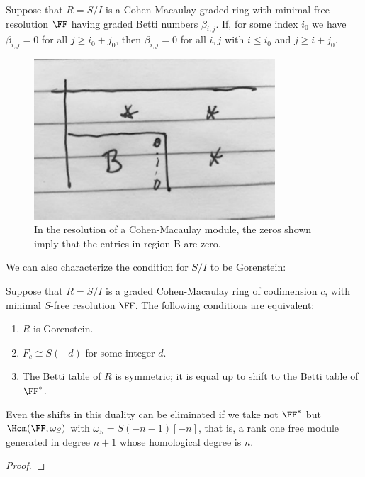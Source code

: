 \begin{corollary}\label{dual zero restrictions}
 Suppose that $R = S/I$ is a Cohen-Macaulay graded ring with minimal free resolution $\FF$ having
 graded Betti numbers
 $\beta_{i,j}$. If, for some index $i_{0}$ we have $\beta_{i,j} = 0$ for all $j\geq i_{0}+j_{0}$, then
 $\beta_{i,j} = 0$ for all $i,j$ with $i\leq i_{0}$ and $j\geq i+j_{0}$. 
 \end{corollary}
\begin{figure}[ht!]
\centering
\includegraphics[width=90mm]{illust-17-4-1.pdf}
\caption{In the resolution of a Cohen-Macaulay module, the zeros shown imply that the entries in region B are zero. \label{17.4.1}}
\end{figure}

We can also characterize the condition for $S/I$ to be Gorenstein:

\begin{proposition}\label{Gorenstein characterization}
Suppose that $R = S/I$ is a graded Cohen-Macaulay ring of codimension $c$, with minimal $S$-free resolution 
$\FF$. The following conditions are equivalent:
\begin{enumerate}
 \item $R$ is Gorenstein.
 \item $F_{c} \cong S(-d)$ for some integer $d$.
 \item The Betti table of $R$ is symmetric; it is equal up to shift to the Betti table of $\FF^{*}$.
\end{enumerate}
\end{proposition}

Even the shifts in this duality can be eliminated if we take not $\FF^{*}$ but $\Hom(\FF, \omega_{S})$ 
with $\omega_{S} = S(-n-1)[-n]$, that is, a rank one free module generated in degree $n+1$ whose
homological degree is $n$.

\begin{proof}
 
\end{proof}

